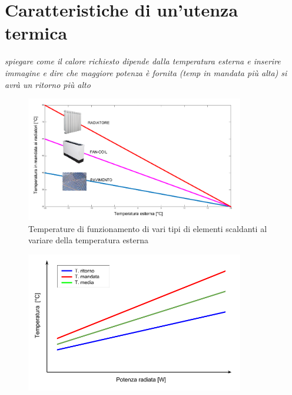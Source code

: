 \documentclass[laurea,oneside,11pt]{USiena_tesiLM}
\begin{document}
\section{Caratteristiche di un'utenza termica}

\textit{spiegare come il calore richiesto dipende dalla temperatura esterna e inserire immagine e dire che maggiore potenza è fornita (temp in mandata più alta) si avrà un ritorno più alto}

\begin{figure}[!ht]
\centering
\includegraphics[width=0.85\textwidth]{figure/elem_scaldanti} 
\caption{Temperature di funzionamento di vari tipi di elementi scaldanti al variare della temperatura esterna}
\label{fig:elem_scaldanti}
\end{figure}

\begin{figure}[!ht]
\centering
\includegraphics[width=0.85\textwidth]{figure/pot_radiatore} 
\caption{}
\label{fig:pot_radiatore}
\end{figure}
\end{document}

